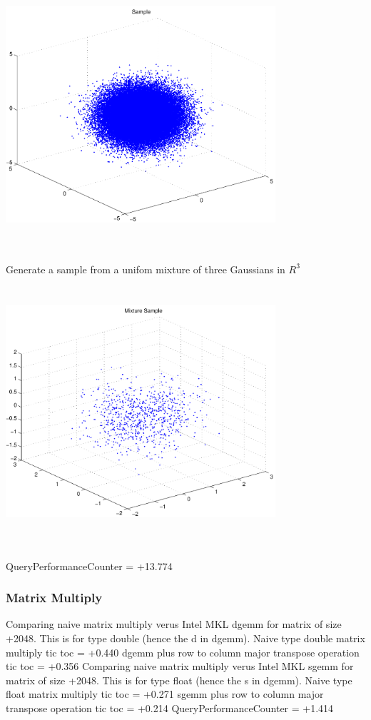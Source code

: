 \documentclass[9pt]{article}
\theoremstyle{plain}
\theoremstyle{definition}
\theoremstyle{remark}
\numberwithin{equation}{section}
\begin{document}
\includegraphics[width=10.0cm,height=10.0cm]{R_3_Normal.pdf}

Generate a sample from a unifom mixture of three Gaussians in $R^3$
\includegraphics[width=10.0cm,height=10.0cm]{R_3_Normal_Mixture.pdf}

QueryPerformanceCounter  =  +13.774
\subsubsection{Matrix Multiply}
Comparing naive matrix multiply verus Intel MKL dgemm for matrix of size +2048.
This is for type double (hence the d in dgemm).
Naive type double matrix multiply tic toc  =  +0.440
dgemm plus row to column major transpose operation tic toc  =  +0.356
Comparing naive matrix multiply verus Intel MKL sgemm for matrix of size +2048.
This is for type float (hence the s in dgemm).
Naive type float matrix multiply tic toc  =  +0.271
sgemm plus row to column major transpose operation tic toc  =  +0.214
QueryPerformanceCounter  =  +1.414
\end{document}
